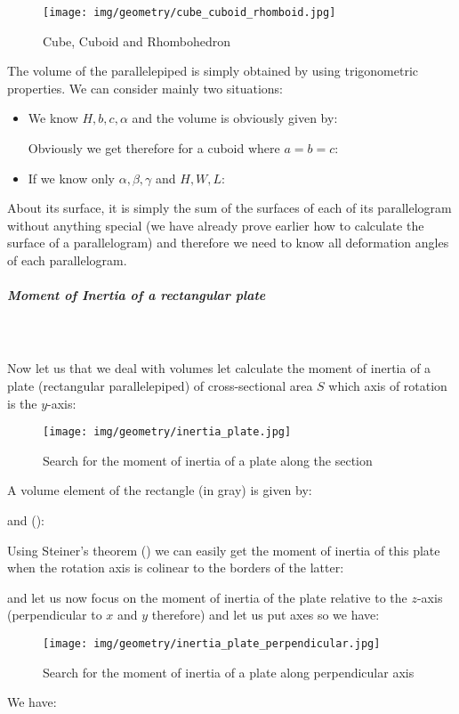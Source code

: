 {\begin{itemize}
	\end{itemize}
	\begin{figure}[H]
		\centering
		\texttt{[image: img/geometry/cube\_cuboid\_rhomboid.jpg]}
		\caption{Cube, Cuboid and Rhombohedron}
	\end{figure}
	
	\pagebreak
	The volume of the parallelepiped is simply obtained by using trigonometric properties. We can consider mainly two situations:
	\begin{itemize}
		\item We know $H,b,c,\alpha$ and the volume is obviously given by:
		
		Obviously we get therefore for a cuboid where $a=b=c$:
		
		\item  If we know only $\alpha,\beta,\gamma$ and $H,W,L$:
		
	\end{itemize}
	About its surface, it is simply the sum of the surfaces of each of its parallelogram without anything special (we have already prove earlier how to calculate the surface of a parallelogram) and therefore we need to know all deformation angles of each parallelogram.
	
	\subparagraph{Moment of Inertia of a rectangular plate}\mbox{}\\\\
	Now let us that we deal with volumes let calculate the moment of inertia of a plate (rectangular parallelepiped) of cross-sectional area $S$ which axis of rotation is the $y$-axis:
	\begin{figure}[H]
		\centering
		\texttt{[image: img/geometry/inertia\_plate.jpg]}
		\caption{Search for the moment of inertia of a plate along the section}
	\end{figure}
	A volume element of the rectangle (in gray) is given by:
	
	and ():
	
	Using Steiner's theorem ()  we can easily get the moment of inertia of this plate when the rotation axis is colinear to the borders of the latter:
	
	and let us now focus on the moment of inertia of the plate relative to the $z$-axis (perpendicular to $x$ and $y$ therefore) and let us put axes so we have:
	\begin{figure}[H]
		\centering
		\texttt{[image: img/geometry/inertia\_plate\_perpendicular.jpg]}
		\caption{Search for the moment of inertia of a plate along perpendicular axis}
	\end{figure}
	We have:
	
}

